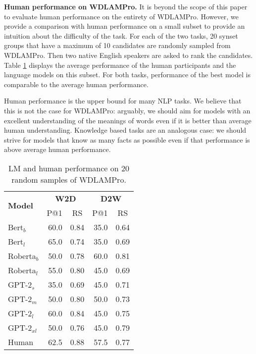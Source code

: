 \documentclass[11pt,a4paper]{article}
\begin{document}
\textbf{Human performance on WDLAMPro.}  It is beyond the
scope of this paper to evaluate human performance on the
entirety of WDLAMPro. However, we provide a comparison with
human performance on a small subset to provide
an intuition about the difficulty of the task. For each of
the two tasks, 20 synset groups that have a maximum of 10
candidates are randomly sampled from WDLAMPro. Then two
native English speakers are asked to rank the
candidates. Table \ref{tab:human_eval} displays the average
performance of the human participants and the language
models on this subset. For both tasks, performance of the
best model is comparable to the average human performance.

Human performance is the upper bound for many NLP
tasks. We believe that this is not the case for WDLAMPro:
arguably, we should aim for models with an excellent
understanding of the meanings of words even if it is better
than average human understanding. Knowledge based tasks are
an analogous case: we should strive for models that know as
many facts as possible even if that performance is above
average human performance.

\begin{table}
    \centering
    \begin{tabular}{l|rrrr}
        \hline
         \multirow{2}{*}{\textbf{Model}} & \multicolumn{2}{c}{\textbf{W2D}} & \multicolumn{2}{c}{\textbf{D2W}} \\
         & \multicolumn{1}{c}{P@1} & \multicolumn{1}{c}{RS} & \multicolumn{1}{c}{P@1} & \multicolumn{1}{c}{RS} \\ \hline
     Bert$_{b}$ & 60.0 & 0.84 & 35.0 & 0.64 \\
     Bert$_{l}$ & 65.0 & 0.74 & 35.0 & 0.69 \\
     Roberta$_{b}$ & 50.0 & 0.78 & 60.0 & 0.81 \\
     Roberta$_{l}$ & 55.0 & 0.80 & 45.0 & 0.69 \\ \hline
     GPT-2$_{s}$ & 35.0 & 0.69 & 45.0 & 0.71 \\
     GPT-2$_{m}$ & 50.0 & 0.80 & 50.0 & 0.73 \\
     GPT-2$_{l}$ & 60.0 & 0.84 & 45.0 & 0.75 \\
     GPT-2$_{xl}$ & 50.0 & 0.76 & 45.0 & 0.79 \\ \hline 
     Human & 62.5 & 0.88 & 57.5 & 0.77 \\ \hline 
     
    \end{tabular}
    \caption{LM and human performance on 20 random samples of WDLAMPro. }
    \label{tab:human_eval}
\end{table}
\end{document}

